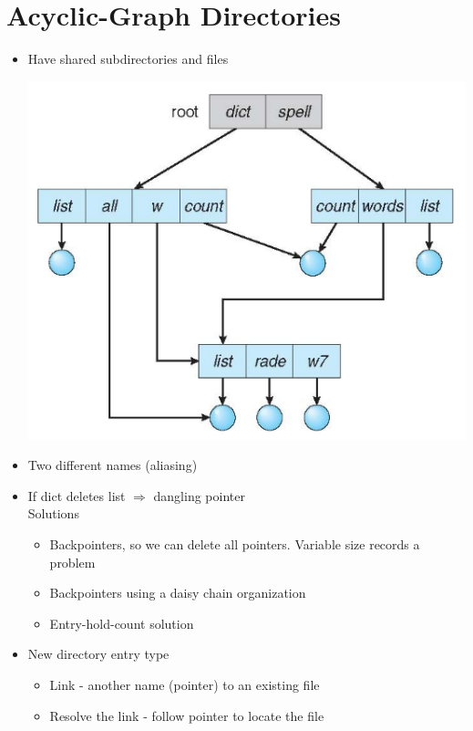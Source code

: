 \documentclass{article}[18pt]
\begin{document}
\section{Acyclic-Graph Directories}
\begin{itemize}
	\item Have shared subdirectories and files
	\begin{center}
		\includegraphics[scale=0.7]{acyclic}
	\end{center}
	\item Two different names (aliasing)
	\item If dict deletes list $\Rightarrow$ dangling pointer\\
	Solutions
	\begin{itemize}
		\item Backpointers, so we can delete all pointers. Variable size records a problem
		\item Backpointers using a daisy chain organization
		\item Entry-hold-count solution
	\end{itemize}
	\item New directory entry type
	\begin{itemize}
		\item Link - another name (pointer) to an existing file
		\item Resolve the link - follow pointer to locate the file
	\end{itemize}
\end{itemize}
\end{document}
